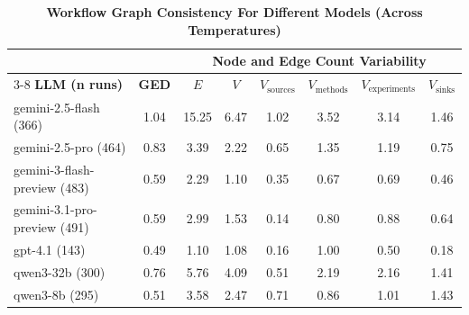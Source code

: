 \documentclass{article}
\begin{document}
\begin{table}[!ht]
\centering
\caption{\textbf{Workflow Graph Consistency For Different Models (Across Temperatures)}}
\label{tab:workflow-consistency-graph-avg-temperature}
\begin{tabular}{lccccccc}
\toprule
 & & \multicolumn{6}{c}{\textbf{Node and Edge Count Variability}} \\
\cmidrule(lr){3-8}
\textbf{LLM (n runs)} & \textbf{GED} & {$E$} & {$V$} & {$V_{\text{sources}}$} & {$V_{\text{methods}}$} & {$V_{\text{experiments}}$} & {$V_{\text{sinks}}$} \\
\midrule
gemini-2.5-flash (366)       & 1.04 & 15.25 & 6.47 & 1.02 & 3.52 & 3.14 & 1.46 \\
gemini-2.5-pro (464)         & 0.83 & 3.39  & 2.22 & 0.65 & 1.35 & 1.19 & 0.75 \\
gemini-3-flash-preview (483) & 0.59 & 2.29  & 1.10 & 0.35 & 0.67 & 0.69 & 0.46 \\
gemini-3.1-pro-preview (491) & 0.59 & 2.99  & 1.53 & 0.14 & 0.80 & 0.88 & 0.64 \\
gpt-4.1 (143)                & 0.49 & 1.10  & 1.08 & 0.16 & 1.00 & 0.50 & 0.18 \\
qwen3-32b (300)              & 0.76 & 5.76  & 4.09 & 0.51 & 2.19 & 2.16 & 1.41 \\
qwen3-8b (295)               & 0.51 & 3.58  & 2.47 & 0.71 & 0.86 & 1.01 & 1.43 \\
\bottomrule
\end{tabular}
\end{table}
\end{document}
